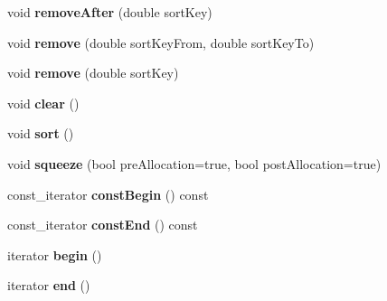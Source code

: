 \begin{DoxyCompactItemize}
\item 
void {\bfseries remove\+After} (double sort\+Key)\hypertarget{class_q_c_p_data_container_abbe5d87ffc10b5aeffa5bb42cf03aa3c}{}\label{class_q_c_p_data_container_abbe5d87ffc10b5aeffa5bb42cf03aa3c}

\item 
void {\bfseries remove} (double sort\+Key\+From, double sort\+Key\+To)\hypertarget{class_q_c_p_data_container_ae5f569a120648b167efa78835f12fd38}{}\label{class_q_c_p_data_container_ae5f569a120648b167efa78835f12fd38}

\item 
void {\bfseries remove} (double sort\+Key)\hypertarget{class_q_c_p_data_container_a2dbded7f0732bacf9db48fdfbbb620bc}{}\label{class_q_c_p_data_container_a2dbded7f0732bacf9db48fdfbbb620bc}

\item 
void {\bfseries clear} ()\hypertarget{class_q_c_p_data_container_a7e2b29736c6fd761649bda1a54ba967f}{}\label{class_q_c_p_data_container_a7e2b29736c6fd761649bda1a54ba967f}

\item 
void {\bfseries sort} ()\hypertarget{class_q_c_p_data_container_a75da92e33063b63d6da5014683591d45}{}\label{class_q_c_p_data_container_a75da92e33063b63d6da5014683591d45}

\item 
void {\bfseries squeeze} (bool pre\+Allocation=true, bool post\+Allocation=true)\hypertarget{class_q_c_p_data_container_a82fcc511def22287fc62579d0706387c}{}\label{class_q_c_p_data_container_a82fcc511def22287fc62579d0706387c}

\item 
const\+\_\+iterator {\bfseries const\+Begin} () const \hypertarget{class_q_c_p_data_container_a8082c1b4ad8737c8de272e7d2ece0dcd}{}\label{class_q_c_p_data_container_a8082c1b4ad8737c8de272e7d2ece0dcd}

\item 
const\+\_\+iterator {\bfseries const\+End} () const \hypertarget{class_q_c_p_data_container_a71de981d30faec3c6fda012ac0e5313e}{}\label{class_q_c_p_data_container_a71de981d30faec3c6fda012ac0e5313e}

\item 
iterator {\bfseries begin} ()\hypertarget{class_q_c_p_data_container_a58c6f18e40003df1759ef571b485d720}{}\label{class_q_c_p_data_container_a58c6f18e40003df1759ef571b485d720}

\item 
iterator {\bfseries end} ()\hypertarget{class_q_c_p_data_container_a3c7d450cdad10302e6102f7fe064223c}{}\label{class_q_c_p_data_container_a3c7d450cdad10302e6102f7fe064223c}


\end{DoxyCompactItemize}
